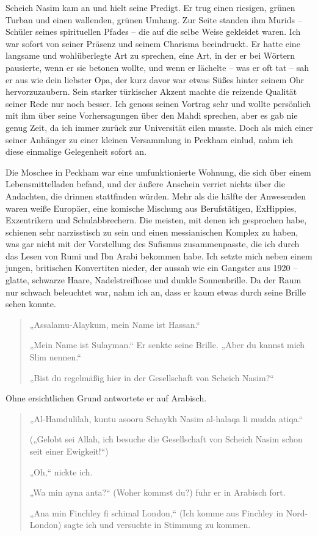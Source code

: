 \documentclass[12pt]{memoir}
\begin{document}
Scheich Nasim kam an und hielt seine Predigt.
Er trug einen riesigen, grünen Turban und einen wallenden, grünen Umhang.
Zur Seite standen ihm Murids – Schüler seines spirituellen Pfades –
die auf die selbe Weise gekleidet waren.
Ich war sofort von seiner Präsenz und seinem Charisma beeindruckt.
Er hatte eine langsame und wohlüberlegte Art zu sprechen, eine Art,
in der er bei Wörtern pausierte, wenn er sie betonen wollte,
und wenn er lächelte – was er oft tat – sah er aus wie dein liebster Opa,
der kurz davor war etwas Süßes hinter seinem Ohr hervorzuzaubern.
Sein starker türkischer Akzent machte die reizende Qualität
seiner Rede nur noch besser.
Ich genoss seinen Vortrag sehr und wollte persönlich mit ihm
über seine Vorhersagungen über den Mahdi sprechen,
aber es gab nie genug Zeit, da ich immer zurück zur Universität eilen musste.
Doch als mich einer seiner Anhänger
zu einer kleinen Versammlung in Peckham einlud,
nahm ich diese einmalige Gelegenheit sofort an.

Die Moschee in Peckham war eine umfunktionierte Wohnung,
die sich über einem Lebensmittelladen befand,
und der äußere Anschein verriet nichts über die Andachten,
die drinnen stattfinden würden.
Mehr als die hälfte der Anwesenden waren weiße Europäer,
eine komische Mischung aus Berufstätigen,
Ex\–Hippies, Exzentrikern und Schulabbrechern.
Die meisten, mit denen ich gesprochen habe,
schienen sehr narzisstisch zu sein und einen messianischen Komplex zu haben,
was gar nicht mit der Vorstellung des Sufismus zusammenpasste,
die ich durch das Lesen von Rumi und Ibn Arabi bekommen habe.
Ich setzte mich neben einem jungen, britischen Konvertiten nieder,
der aussah wie ein Gangster aus 1920 –
glatte, schwarze Haare, Nadelstreifhose und dunkle Sonnenbrille.
Da der Raum nur schwach beleuchtet war, nahm ich an,
dass er kaum etwas durch seine Brille sehen konnte.

\begin{quote}
„Assalamu-Alaykum, mein Name ist Hassan.“

„Mein Name ist Sulayman.“
Er senkte seine Brille.
„Aber du kannst mich Slim nennen.“

„Bist du regelmäßig hier in der Gesellschaft von Scheich Nasim?“
\end{quote}

Ohne ersichtlichen Grund antwortete er auf Arabisch.

\begin{quote}
„Al-Hamdulilah, kuntu asooru Schaykh Nasim al-halaqa li mudda atiqa.“

(„Gelobt sei Allah, ich besuche die Gesellschaft von Scheich Nasim
schon seit einer Ewigkeit!“)

„Oh,“ nickte ich.

„Wa min ayna anta?“ (Woher kommst du?) fuhr er in Arabisch fort.

„Ana min Finchley fi schimal London,“
(Ich komme aus Finchley in Nord-London)
sagte ich und versuchte in Stimmung zu kommen.
\end{quote}
\end{document}
